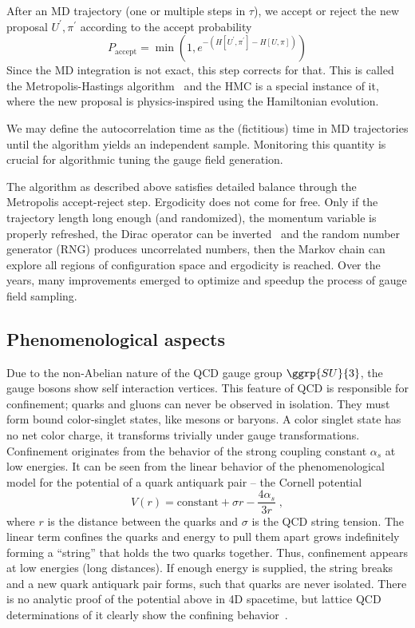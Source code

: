 After an MD trajectory (one or multiple steps in $\tau$), we accept or reject the new proposal $U^{\prime}, \pi^{\prime}$ according to the accept probability
\begin{equation}
P_{\text{accept}} = \min \left( 1, e^{-(H[U^{\prime}, \pi^{\prime}] - H[U, \pi])} \right)
\end{equation}
Since the MD integration is not exact, this step corrects for that.
This is called the Metropolis-Hastings algorithm~\cite{10.1063/1.1699114,10.1093/biomet/57.1.97} and the HMC is a special instance of it, where the new proposal is physics-inspired using the Hamiltonian evolution.

We may define the autocorrelation time as the (fictitious) time in MD trajectories until the algorithm yields an independent sample.
Monitoring this quantity is crucial for algorithmic tuning the gauge field generation.

The algorithm as described above satisfies detailed balance through the Metropolis accept-reject step.
Ergodicity does not come for free.
Only if the trajectory length long enough (and randomized), the momentum variable is properly refreshed, the Dirac operator can be inverted~\cite{Gupta:1990ka} and the random number generator (RNG) produces uncorrelated numbers, then the Markov chain can explore all regions of configuration space and ergodicity is reached.
Over the years, many improvements emerged to optimize and speedup the process of gauge field sampling.

\subsection{Phenomenological aspects}

Due to the non-Abelian nature of the QCD gauge group $\ggrp{SU}{3}$, the gauge bosons show self interaction vertices.
This feature of QCD is responsible for confinement; quarks and gluons can never be observed in isolation.
They must form bound color-singlet states, like mesons or baryons.
A color singlet state has no net color charge, it transforms trivially under  gauge transformations.
Confinement originates from the behavior of the strong coupling constant $\alpha_s$ at low energies.
It can be seen from the linear behavior of the phenomenological model for the potential of a quark antiquark pair -- the Cornell potential~\cite{PhysRevLett.34.369,PhysRevD.17.3090}
\begin{equation}
V(r) = \text{constant} + \sigma r - \frac{4 \alpha_s}{3r} \;,
\end{equation}
where $r$ is the distance between the quarks and $\sigma$ is the QCD string tension.
The linear term confines the quarks and energy to pull them apart grows indefinitely forming a ``string'' that holds the two quarks together.
Thus, confinement appears at low energies (long distances).
If enough energy is supplied, the string breaks and a new quark antiquark pair forms, such that quarks are never isolated.
There is no analytic proof of the potential above in 4D spacetime, but lattice QCD determinations of it clearly show the confining behavior~\cite{BORN1994325,PhysRevLett.107.091601}.

